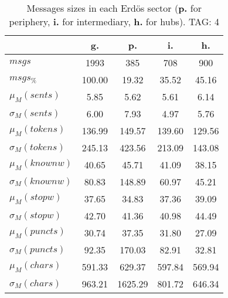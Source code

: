 \begin{table}[h!]
\begin{center}
\begin{tabular}{| l | c | c | c | c |}\hline
 & g. & p. & i. & h. \\\hline
$msgs$ & 1993  & 385  & 708  & 900 \\\hline
$msgs_{\%}$ & 100.00  & 19.32  & 35.52  & 45.16 \\\hline
$\mu_M(sents)$ & 5.85  & 5.62  & 5.61  & 6.14 \\\hline
$\sigma_M(sents)$ & 6.00  & 7.93  & 4.97  & 5.76 \\\hline
$\mu_M(tokens)$ & 136.99  & 149.57  & 139.60  & 129.56 \\\hline
$\sigma_M(tokens)$ & 245.13  & 423.56  & 213.09  & 143.08 \\\hline
$\mu_M(knownw)$ & 40.65  & 45.71  & 41.09  & 38.15 \\\hline
$\sigma_M(knownw)$ & 80.83  & 148.89  & 60.97  & 45.21 \\\hline
$\mu_M(stopw)$ & 37.65  & 34.83  & 37.36  & 39.09 \\\hline
$\sigma_M(stopw)$ & 42.70  & 41.36  & 40.98  & 44.49 \\\hline
$\mu_M(puncts)$ & 30.74  & 37.35  & 31.80  & 27.09 \\\hline
$\sigma_M(puncts)$ & 92.35  & 170.03  & 82.91  & 32.81 \\\hline
$\mu_M(chars)$ & 591.33  & 629.37  & 597.84  & 569.94 \\\hline
$\sigma_M(chars)$ & 963.21  & 1625.29  & 801.72  & 646.34 \\\hline
\end{tabular}
\caption{Messages sizes in each Erd\"os sector ({{\bf p.}} for periphery, {{\bf i.}} for intermediary, {{\bf h.}} for hubs). TAG: 4}
\end{center}
\end{table}